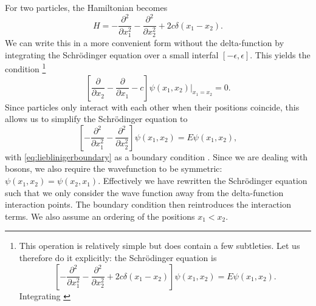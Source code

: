 \documentclass[11pt, a4paper,draft]{report} %
\begin{document}
For two particles, the Hamiltonian becomes
\begin{equation}
	H =  - \frac{\partial^2}{\partial x_1^2} - \frac{\partial^2}{\partial x_2^2} + 2c \delta(x_1 - x_2).
\end{equation}
We can write this in a more convenient form without the delta-function by integrating the Schrödinger equation over a small interfal \([-\epsilon,\epsilon]\).
This yields the condition \cite{Lieb1963}\footnote{This operation is relatively simple but does contain a few subtleties. Let us therefore do it explicitly:
the Schrödinger equation is
\begin{equation}
	\left[- \frac{\partial^2}{\partial x_1^2} - \frac{\partial^2}{\partial x_2^2} + 2c \delta(x_1 - x_2)\right] \psi(x_1, x_2) = E \psi(x_1,x_2).
\end{equation} 
Integrating \cite{Griffiths1993}
}
\begin{equation}\label{eq:lieblinigerboundary}
	\left[\frac{\partial}{\partial x_2} - \frac{\partial}{\partial x_1} - c\right] \psi(x_1, x_2)\bigg\rvert_{x_1 = x_2} = 0.
\end{equation}
Since particles only interact with each other when their positions coincide, this allows us to simplify the Schrödinger equation to
\begin{equation}\label{eq:lieblinigersimple}
	\left[- \frac{\partial^2}{\partial x_1^2} - \frac{\partial^2}{\partial x_2^2}\right] \psi(x_1, x_2) = E \psi(x_1,x_2),
\end{equation}
with \cref{eq:lieblinigerboundary} as a boundary condition \cite{Lieb1963}.
Since we are dealing with bosons, we also require the wavefunction to be symmetric: \(\psi(x_1,x_2) = \psi(x_2,x_1)\).
Effectively we have rewritten the Schrödinger equation such that we only consider the wave function away from the delta-function interaction points.
The boundary condition then reintroduces the interaction terms.
We also assume an ordering of the positions \(x_1 < x_2\).
\end{document}

